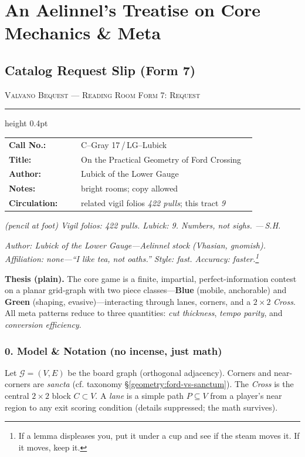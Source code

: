 \documentclass[11pt]{article}
\numberwithin{equation}{section} %
\theoremstyle{plain} %
\theoremstyle{definition} %
\theoremstyle{remark} %
\begin{document}
\clearpage
\section{An Aelinnel's Treatise on Core Mechanics \& Meta}
\label{geometry:aelinnel-core}

\subsection*{Catalog Request Slip (Form 7)}

\small
\noindent\textsc{Valvano Bequest --- Reading Room} \hfill \textsc{Form 7: Request}\\[-2pt]
\hrule height 0.4pt
\medskip
\begin{tabular}{@{}p{0.28\linewidth}p{0.68\linewidth}@{}}
\textbf{Call No.:} & C--Gray 17\,/\,LG--Lubick \\
\textbf{Title:} & On the Practical Geometry of Ford Crossing \\
\textbf{Author:} & Lubick of the Lower Gauge \\
\textbf{Notes:} & bright rooms; copy allowed \\
\textbf{Circulation:} & related vigil folios \textit{422 pulls}; this tract \textit{9} \\
\end{tabular}

\medskip
\noindent\footnotesize\itshape
(pencil at foot) Vigil folios: 422 pulls. Lubick: 9. Numbers, not sighs. ---\,S.H.
\normalsize

\medskip
\noindent\textit{Author: Lubick of the Lower Gauge---Aelinnel stock (Vhasian, gnomish). Affiliation: none---``I like tea, not oaths.'' Style: fast. Accuracy: faster.\footnote{If a lemma displeases you, put it under a cup and see if the steam moves it. If it moves, keep it.}}

\medskip
\noindent\textbf{Thesis (plain).} The core game is a finite, impartial, perfect-information contest on a planar grid-graph with two piece classes---\textbf{Blue} (mobile, anchorable) and \textbf{Green} (shaping, evasive)---interacting through lanes, corners, and a \(2\times 2\) \emph{Cross}. All meta patterns reduce to three quantities: \emph{cut thickness}, \emph{tempo parity}, and \emph{conversion efficiency}.

\subsubsection{0. Model \& Notation (no incense, just math)}
Let \(\mathcal{G}=(V,E)\) be the board graph (orthogonal adjacency). Corners and near-corners are \emph{sancta} (cf. taxonomy \S\ref{geometry:ford-vs-sanctum}). The \emph{Cross} is the central \(2\times 2\) block \(C\subset V\). A \emph{lane} is a simple path \(P\subseteq V\) from a player's near region to any exit scoring condition (details suppressed; the math survives).
\end{document}
